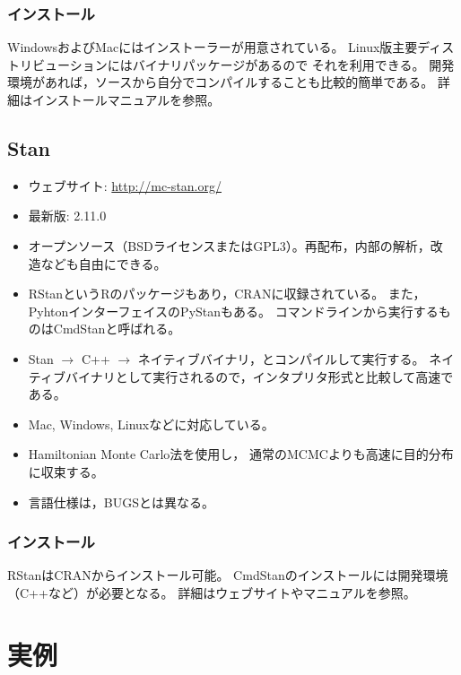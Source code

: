 \documentclass[11pt,uplatex]{jsarticle}
\begin{document}
\subsubsection*{インストール}
WindowsおよびMacにはインストーラーが用意されている。
Linux版主要ディストリビューションにはバイナリパッケージがあるので
それを利用できる。
開発環境があれば，ソースから自分でコンパイルすることも比較的簡単である。
詳細はインストールマニュアルを参照。

\subsection{Stan}
\label{Stan}
\begin{itemize}

\item ウェブサイト:
  \url{http://mc-stan.org/}

\item 最新版: 2.11.0
\item オープンソース（BSDライセンスまたはGPL3）。再配布，内部の解析，改
  造なども自由にできる。
\item \textsf{RStan}という\textsf{R}のパッケージもあり，CRANに収録されている。
また，Pyhtonインターフェイスの\textsf{PyStan}もある。
コマンドラインから実行するものは\textsf{CmdStan}と呼ばれる。
\item Stan $\rightarrow$ C++ $\rightarrow$ ネイティブバイナリ，とコンパイルして実行する。
ネイティブバイナリとして実行されるので，インタプリタ形式と比較して高速である。
\item Mac, Windows, Linuxなどに対応している。
\item Hamiltonian Monte Carlo法\cite{PRML, BDA3, Toyoda2015}を使用し，
通常のMCMCよりも高速に目的分布に収束する。
\item 言語仕様は，BUGSとは異なる。
\end{itemize}

\subsubsection*{インストール}
RStanはCRANからインストール可能。
CmdStanのインストールには開発環境（C++など）が必要となる。
詳細はウェブサイトやマニュアルを参照。


\pagebreak

\section{実例}
\end{document}
